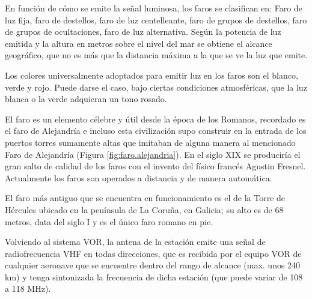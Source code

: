 En función de cómo se emite la señal luminosa, los faros se clasifican en: Faro de luz fija, faro de destellos, faro de luz centelleante, faro de grupos de destellos, faro de grupos de ocultaciones, faro de luz alternativa. Según la potencia de luz emitida y la altura en metros sobre el nivel del mar se obtiene el alcance geográfico, que no es más que la distancia máxima a la que se ve la luz que emite.

Los colores universalmente adoptados para emitir luz en los faros son el blanco, verde y rojo. Puede darse el caso, bajo ciertas condiciones atmosféricas, que la luz blanca o la verde adquieran un tono rosado.


El faro es un elemento célebre y útil desde la época de los Romanos, recordado es el faro de Alejandría e incluso esta civilización  supo construir en la entrada de los puertos torres sumamente altas que imitaban de alguna manera al mencionado Faro de Alejandr\'ia (Figura \ref{fig:faro.alejandria}). En el siglo XIX se produciría el gran salto de calidad de los faros con el invento del físico francés Agustin Fresnel. Actualmente los faros son operados a distancia y de manera automática.


El faro más antiguo que se encuentra en funcionamiento es el de la Torre de Hércules ubicado en la península de La Coruña, en Galicia; su alto es de 68 metros, data del siglo I y es el único faro romano en pie.

Volviendo al sistema VOR, la antena de la estaci\'on emite una se\~nal de radiofrecuencia VHF en todas direcciones, que es recibida por el equipo VOR de cualquier aeronave que se encuentre dentro del rango de alcance (max. unos 240 km) y tenga sintonizada la frecuencia de dicha estaci\'on (que puede variar de 108 a 118 MHz).

